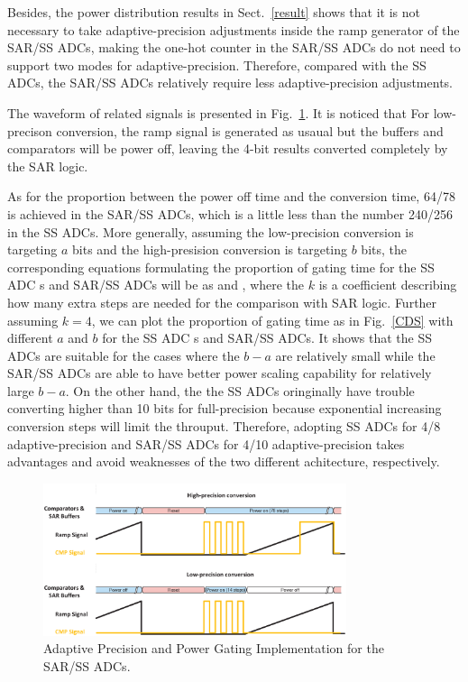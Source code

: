 Besides, the power distribution results in Sect.~\ref{result} shows that it is not necessary to take adaptive-precision adjustments inside the ramp generator of the SAR/SS ADCs, making the one-hot counter in the SAR/SS ADCs do not need to support two modes for adaptive-precision.
Therefore, compared with the SS ADCs,  the SAR/SS ADCs relatively require less adaptive-precision adjustments.

The waveform of related signals is presented in Fig.~\ref{SAR_pg}. It is noticed that For low-precison conversion, the ramp signal is generated as usaual but the buffers and comparators will be power off, leaving the 4-bit results converted completely by the SAR logic. 

As for the proportion between the power off time and the conversion time, 64/78 is achieved in the SAR/SS ADCs, which is a little less than the number 240/256 in the SS ADCs. More generally, assuming the low-precision conversion is targeting $a$ bits and the high-presision conversion is targeting $b$ bits, the corresponding equations formulating the proportion of gating time for the SS ADC s and SAR/SS ADCs will be as and , where the $k$ is a coefficient describing how many extra steps are needed for the comparison with SAR logic. Further assuming $k=4$, we can plot the proportion of gating time as in Fig.~\ref{CDS} with different $a$ and $b$ for the SS ADC s and SAR/SS ADCs. It shows that the SS ADCs are suitable for the cases where the $b-a$ are relatively small while the SAR/SS ADCs are able to have better power scaling capability for relatively large $b-a$. On the other hand, the the SS ADCs oringinally have trouble converting higher than 10 bits for full-precision because exponential increasing conversion steps will limit the throuput. Therefore, adopting SS ADCs for 4/8 adaptive-precision and SAR/SS ADCs for 4/10 adaptive-precision takes advantages and avoid weaknesses of the two different achitecture, respectively.

\begin{figure}[htbp]
	\centerline{\includegraphics[width=3.5in]{./Figures/SAR_pg.eps}}
	\caption{Adaptive Precision and Power Gating Implementation for the SAR/SS ADCs.}
	\label{SAR_pg}
\end{figure} 